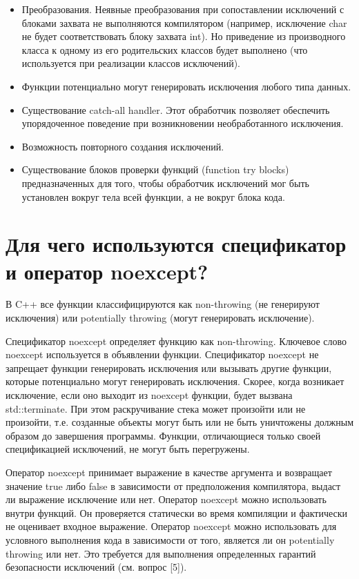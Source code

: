 \documentclass[a4paper,12pt]{article}	%
\begin{document}
\begin{itemize}
		\item Преобразования. Неявные преобразования при сопоставлении исключений с блоками захвата не выполняются компилятором (например, исключение char не будет соответствовать блоку захвата int). Но приведение из производного класса к одному из его родительских классов будет выполнено (что используется при реализации классов исключений).
			
		\item Функции потенциально могут генерировать исключения любого типа данных.
		
		\item Существование catch-all handler. Этот обработчик позволяет обеспечить упорядоченное поведение при возникновении необработанного исключения.
		
		\item Возможность повторного создания исключений.
		
		\item Существование блоков проверки функций (function try blocks) предназначенных для того, чтобы обработчик исключений мог быть установлен вокруг тела всей функции, а не вокруг блока кода. 
		
	\end{itemize}
	
\newpage

\section{Для чего используются спецификатор и оператор noexcept?}

	В C++ все функции классифицируются как non-throwing (не генерируют исключения) или potentially throwing (могут генерировать исключение).
	
	Спецификатор noexcept определяет функцию как non-throwing. Ключевое слово noexcept используется в объявлении функции. Спецификатор noexcept не запрещает функции генерировать исключения или вызывать другие функции, которые потенциально могут генерировать исключения. Скорее, когда возникает исключение, если оно выходит из noexcept функции, будет вызвана std::terminate. При этом раскручивание стека может произойти или не произойти, т.е. созданные объекты могут быть или не быть уничтожены должным образом до завершения программы. Функции, отличающиеся только своей спецификацией исключений, не могут быть перегружены.
	
	Оператор noexcept принимает выражение в качестве аргумента и возвращает значение true либо false в зависимости от предположения компилятора, выдаст ли выражение исключение или нет. Оператор noexcept можно использовать внутри функций. Он проверяется статически во время компиляции и фактически не оценивает входное выражение. Оператор noexcept можно использовать для условного выполнения кода в зависимости от того, является ли он potentially throwing или нет. Это требуется для выполнения определенных гарантий безопасности исключений (см. вопрос [5]).
	
\end{document}
